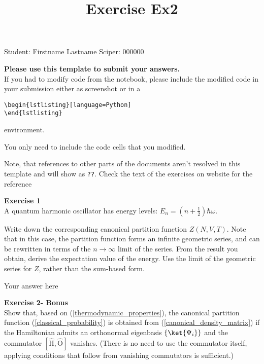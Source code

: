 \documentclass{article}
\title{Exercise Ex2}
\begin{document}
\maketitle\maketitle
\begin{center}\logo\end{center}


Student:  Firstname Lastname    Sciper: 000000

\begin{mdframed}
\textbf{Please use this template to submit your answers.}\\
If you had to modify code from the notebook, please include the modified code in your submission either as screenshot or in a

\begin{verbatim}
\begin{lstlisting}[language=Python]
\end{lstlisting}
\end{verbatim}

environment.

You only need to include the code cells that you modified.

Note, that references to other parts of the documents aren't resolved in this template and will show as \texttt{??}. Check the text of the exercises on website for the reference
\end{mdframed}

\begin{mdframed}
\textbf{Exercise 1}\\
A quantum harmonic oscillator has energy levels: $E_n = \left(n + \frac{1}{2}\right)\hbar \omega$.\newline

Write down the corresponding canonical partition function
$Z(N,V,T)$.  Note that in this case, the partition function forms an
infinite geometric series, and can be rewritten in terms of the
$n \rightarrow \infty$ limit of the series.
From the result you obtain, derive the expectation value of the energy.
Use the limit of the geometric series for $Z$, rather than the sum-based form.
\end{mdframed}

Your answer here

\begin{mdframed}
\textbf{Exercise 2- Bonus}\\
Show that, based on (\ref{thermodynamic_properties}), the canonical partition function (\ref{classical_probability}) is obtained from (\ref{canonical_density_matrix}) if the Hamiltonian admits an orthonormal eigenbasis $\left\{\ket{\Psi_i}\right\}$ and the commutator $\left[\hat{\mathrm{H}},\hat{\mathrm{O}}\right]$ vanishes. (There is no need to use the commutator itself, applying conditions that follow from vanishing commutators is sufficient.)
\end{mdframed}
\end{document}
